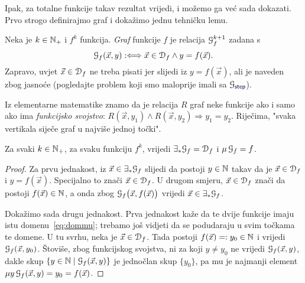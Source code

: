 Ipak, za totalne funkcije takav rezultat vrijedi, i možemo ga već sada dokazati. Prvo strogo definirajmo graf i dokažimo jednu tehničku lemu.

\begin{definicija}[{name=[graf brojevne funkcije]}]
Neka je $k\in{\mathbb N}_+$ i $f^k$ funkcija. \emph{Graf} funkcije $f$ je relacija $\mathcal G_{f}^{k+1}$ zadana s
\begin{equation}
    \label{eq:defgraf}\mathcal G_{f}(\vec x,y):\Longleftrightarrow\vec x\in\mathcal D_{f}\land y=f(\vec x)\text.
\end{equation}
Zapravo, uvjet $\vec x\in\mathcal D_{f}$ ne treba pisati jer slijedi iz $y=f(\vec x)$, ali je naveden zbog jasnoće (pogledajte problem koji smo maloprije imali sa $\graf{\f{step}}$).
\end{definicija}

\begin{napomena}[{name=[funkcijsko svojstvo grafova]}]\label{nap:graf=funsv}
    Iz elementarne matematike znamo da je relacija $R$ graf neke funkcije ako i samo ako ima \emph{funkcijsko svojstvo}: $R(\vec x,y_1)\land R(\vec x,y_2)\Rightarrow y_1=y_2$. Riječima, "svaka vertikala siječe graf u najviše jednoj točki".
\end{napomena}

\begin{lema}[{name=[projekcija i minimizacija grafa]}]\label{lm:projmugraf}
Za svaki $k\in{\mathbb N}_+$, za svaku funkciju $f^k$\!, vrijedi
	$\exists_*\mathcal G_{f}=\mathcal D_{f}$ i %
	$\mu\,\mathcal G_{f}=f$.
\end{lema}
\begin{proof}
Za prvu jednakost, iz $\vec x\in\exists_*\mathcal G_{f}$ slijedi da postoji $y\in{\mathbb N}$ takav da je $\vec x\in\mathcal D_{f}$ i $y=f(\vec x)$. Specijalno to znači $\vec x\in\mathcal D_{f}$. U drugom smjeru, $\vec x\in\mathcal D_{f}$ znači da postoji $f(\vec x)\in{\mathbb N}$, a onda zbog $\mathcal G_{f}\bigl(\vec x,f(\vec x)\bigr)$ vrijedi $\vec x\in\exists_*\mathcal G_{f}$.

Dokažimo sada drugu jednakost. Prva jednakost kaže da te dvije funkcije imaju istu domenu~\eqref{eq:dommu}; trebamo još vidjeti da se podudaraju u svim točkama te domene. U tu svrhu, neka je $\vec x\in\mathcal D_{f}$. Tada postoji $f(\vec x)=:y_0\in{\mathbb N}$ i vrijedi $\mathcal G_{f}(\vec x,y_0)$. Štoviše, zbog funkcijskog svojstva, ni za koji $y\ne y_0$ ne vrijedi $\mathcal G_{f}(\vec x,y)$, dakle skup $\{y\in{\mathbb N}\mid\mathcal G_{f}(\vec x,y)\}$ je jednočlan skup $\{y_0\}$, pa mu je najmanji element $\mu y\,\mathcal G_{f}(\vec x,y)=y_0=f(\vec x)$.
\end{proof}

